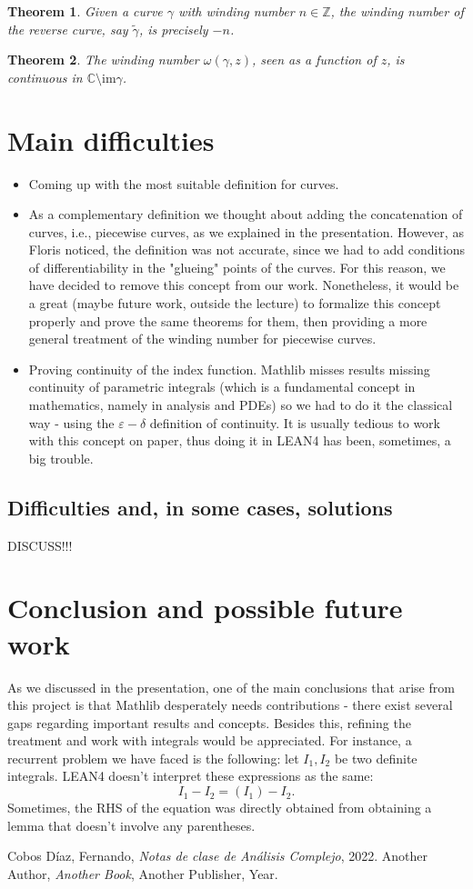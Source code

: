 \documentclass[a4paper,12pt]{article}
\newtheorem{theorem}{Theorem}
\begin{document}
\begin{theorem}
  Given a curve $\gamma$ with winding number $n \in \mathbb{Z}$, the winding number of the reverse curve,
  say $\tilde{\gamma}$, is precisely $-n$.
\end{theorem}

\begin{theorem}
  The winding number $\omega(\gamma, z)$, seen as a function of $z$, is continuous in $\mathbb{C}\setminus \text{im}\gamma$.
\end{theorem}
\section{Main difficulties}
\begin{itemize}
  \item Coming up with the most suitable definition for curves.
  \item As a complementary definition we thought about adding the concatenation of curves, i.e.,
  piecewise curves, as we explained in the presentation. However, as Floris noticed, the definition was not
  accurate, since we had to add conditions of differentiability in the "glueing" points of the curves. For this
  reason, we have decided to remove this concept from our work. Nonetheless, it would be a great (maybe future work,
  outside the lecture) to formalize this concept properly and prove the same theorems for them, then providing a
  more general treatment of the winding number for piecewise curves.
  \item Proving continuity of the index function. Mathlib misses results missing continuity of parametric
  integrals (which is a fundamental concept in mathematics, namely in analysis and PDEs) so we had to do it the classical
  way - using the $\varepsilon - \delta$ definition of continuity. It is usually tedious to work with this concept
  on paper, thus doing it in LEAN4 has been, sometimes, a big trouble.
\end{itemize}
\subsection{Difficulties and, in some cases, solutions}
DISCUSS!!!

\section{Conclusion and possible future work}
As we discussed in the presentation, one of the main conclusions that arise from this project is that
Mathlib desperately needs contributions - there exist several gaps regarding important results and concepts.
Besides this, refining the treatment and work with integrals would be appreciated. For instance, a recurrent problem
we have faced is the following: let $I_1, I_2$ be two definite integrals. LEAN4 doesn't interpret these expressions as the same:
$$I_1 - I_2 = (I_1) - I_2.$$
Sometimes, the RHS of the equation was directly obtained from obtaining a lemma that doesn't involve any parentheses.

\begin{thebibliography}{9}
 Cobos Díaz, Fernando, \textit{Notas de clase de Análisis Complejo}, 2022.
 Another Author, \textit{Another Book}, Another Publisher, Year.
\end{thebibliography}
\end{document}
